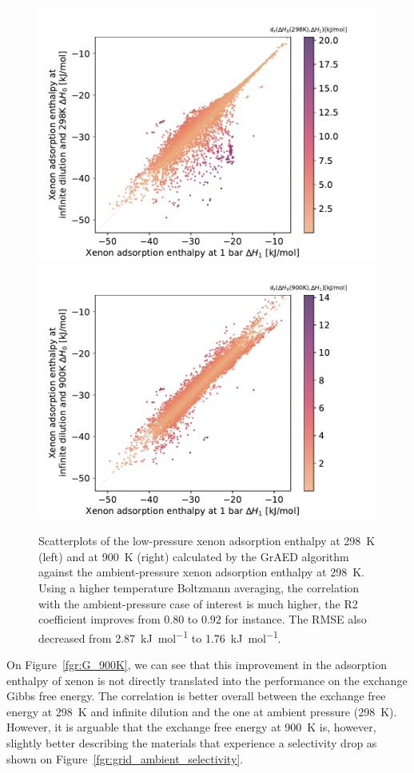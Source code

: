 \documentclass[main]{subfiles}
\begin{document}
\begin{figure}[ht]
\centering
  \includegraphics[width=0.45\linewidth]{figures/4-ml/SI_figure/Scatterplot_H1_H0.pdf}
  \includegraphics[width=0.45\linewidth]{figures/4-ml/SI_figure/Scatterplot_H1_H900K.pdf}
  \caption{Scatterplots of the low-pressure xenon adsorption enthalpy at \SI{298}{\kelvin} (left) and at \SI{900}{\kelvin} (right) calculated by the GrAED algorithm against the ambient-pressure xenon adsorption enthalpy at \SI{298}{\kelvin}. Using a higher temperature Boltzmann averaging, the correlation with the ambient-pressure case of interest is much higher, the R2 coefficient improves from $0.80$ to $0.92$ for instance. The RMSE also decreased from \SI{2.87}{\kilo\joule\per\mole} to \SI{1.76}{\kilo\joule\per\mole}. }\label{fgr:H_900K}
\end{figure}

On Figure~\ref{fgr:G_900K}, we can see that this improvement in the adsorption enthalpy of xenon is not directly translated into the performance on the exchange Gibbs free energy. The correlation is better overall between the exchange free energy at \SI{298}{\kelvin} and infinite dilution and the one at ambient pressure (\SI{298}{\kelvin}). However, it is arguable that the exchange free energy at \SI{900}{\kelvin} is, however, slightly better describing the materials that experience a selectivity drop as shown on Figure~\ref{fgr:grid_ambient_selectivity}. 
\end{document}
